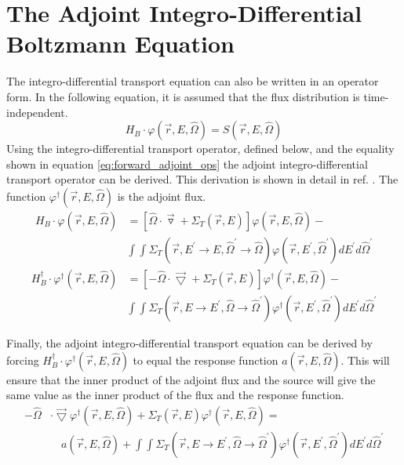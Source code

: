 \section{The Adjoint Integro-Differential Boltzmann Equation}
The integro-differential transport equation can also be written in an
operator form. In the following equation, it is assumed that the flux 
distribution is time-independent.
\begin{equation}
  H_B \cdot \varphi(\vec{r},E,\hat{\Omega}) = S(\vec{r},E,\hat{\Omega})
\end{equation}
Using the integro-differential transport operator, defined below, and the 
equality shown in equation \ref{eq:forward_adjoint_ops} the adjoint 
integro-differential transport operator can be derived. This derivation is shown
in detail in ref. \citep{lewis_computational_1993}. The function 
$\varphi^{\dagger}(\vec{r},E,\hat{\Omega})$ is the adjoint flux.
\begin{equation}
  \begin{split}
    H_B \cdot \varphi(\vec{r},E,\hat{\Omega}) &= 
    \left[ \hat{\Omega} \cdot \vec{\triangledown} +
     \Sigma_T(\vec{r},E) \right] \varphi(\vec{r},E,\hat{\Omega}) - \\
     & \int\int \Sigma_T(\vec{r},E^{'} \to E,\hat{\Omega}^{'} \to \hat{\Omega})
    \varphi(\vec{r},E^{'},\hat{\Omega}^{'}) dE^{'} d\hat{\Omega}^{'}
  \end{split}
  \label{eq:integro_diff_trans_op}
\end{equation}
\begin{equation}
  \begin{split}
    H_B^{\dagger} \cdot \varphi^{\dagger}(\vec{r},E,\hat{\Omega}) &= 
    \left[ -\hat{\Omega} \cdot \vec{\bigtriangledown} +
     \Sigma_T(\vec{r},E) \right] \varphi^{\dagger}(\vec{r},E,\hat{\Omega}) - \\
     & \int\int \Sigma_T(\vec{r},E \to E^{'},\hat{\Omega} \to \hat{\Omega}^{'})
    \varphi^{\dagger}(\vec{r},E^{'},\hat{\Omega}^{'}) dE^{'} d\hat{\Omega}^{'}
  \end{split}
  \label{eq:integro_diff_adj_trans_op}
\end{equation}

Finally, the adjoint integro-differential transport equation can be derived by
forcing $H_B^{\dagger} \cdot \varphi^{\dagger}(\vec{r},E,\hat{\Omega})$ to equal
the response function $a(\vec{r},E,\hat{\Omega})$. This will ensure that the
inner product of the adjoint flux and the source will give the same value as
the inner product of the flux and the response function.
\begin{equation}
  \begin{split}
    -\hat{\Omega} &\cdot \vec{\bigtriangledown} 
    \varphi^{\dagger}(\vec{r},E,\hat{\Omega})
    + \Sigma_T(\vec{r},E) \varphi^{\dagger}(\vec{r},E,\hat{\Omega}) = \\
    & \quad a(\vec{r},E,\hat{\Omega}) +
    \int\int \Sigma_T(\vec{r},E \to E^{'},\hat{\Omega} \to \hat{\Omega}^{'})
    \varphi^{\dagger}(\vec{r},E^{'},\hat{\Omega}^{'}) dE^{'}d\hat{\Omega}^{'} 
  \end{split}
  \label{eq:integro_diff_adj_boltzmann_eqn}
\end{equation}

